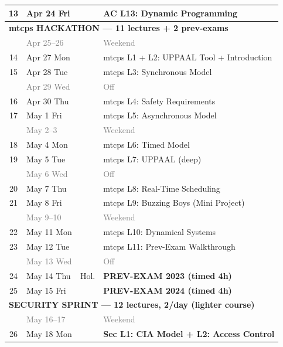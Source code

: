 \documentclass[11pt,a4paper]{article}
\begin{document}
\begin{center}
\begin{tabular}{clll}
13 & Apr 24 Fri & & \textcolor{accolor}{AC L13: Dynamic Programming} \\
\midrule
\multicolumn{4}{l}{\textcolor{mtcpscolor}{\textbf{mtcps HACKATHON --- 11 lectures + 2 prev-exams}}} \\
\midrule
  & \textcolor{gray}{Apr 25--26} & & \textcolor{gray}{Weekend} \\
14 & Apr 27 Mon & & \textcolor{mtcpscolor}{mtcps L1 + L2: UPPAAL Tool + Introduction} \\
15 & Apr 28 Tue & & \textcolor{mtcpscolor}{mtcps L3: Synchronous Model} \\
  & \textcolor{gray}{Apr 29 Wed} & & \textcolor{gray}{Off} \\
16 & Apr 30 Thu & & \textcolor{mtcpscolor}{mtcps L4: Safety Requirements} \\
17 & May 1 Fri & & \textcolor{mtcpscolor}{mtcps L5: Asynchronous Model} \\
  & \textcolor{gray}{May 2--3} & & \textcolor{gray}{Weekend} \\
18 & May 4 Mon & & \textcolor{mtcpscolor}{mtcps L6: Timed Model} \\
19 & May 5 Tue & & \textcolor{mtcpscolor}{mtcps L7: UPPAAL (deep)} \\
  & \textcolor{gray}{May 6 Wed} & & \textcolor{gray}{Off} \\
20 & May 7 Thu & & \textcolor{mtcpscolor}{mtcps L8: Real-Time Scheduling} \\
21 & May 8 Fri & & \textcolor{mtcpscolor}{mtcps L9: Buzzing Boys (Mini Project)} \\
  & \textcolor{gray}{May 9--10} & & \textcolor{gray}{Weekend} \\
22 & May 11 Mon & & \textcolor{mtcpscolor}{mtcps L10: Dynamical Systems} \\
23 & May 12 Tue & & \textcolor{mtcpscolor}{mtcps L11: Prev-Exam Walkthrough} \\
  & \textcolor{gray}{May 13 Wed} & & \textcolor{gray}{Off} \\
24 & May 14 Thu & \textcolor{successgreen}{Hol.} & \textcolor{mtcpscolor}{\textbf{PREV-EXAM 2023 (timed 4h)}} \\
25 & May 15 Fri & & \textcolor{mtcpscolor}{\textbf{PREV-EXAM 2024 (timed 4h)}} \\
\midrule
\multicolumn{4}{l}{\textbf{SECURITY SPRINT --- 12 lectures, 2/day (lighter course)}} \\
\midrule
  & \textcolor{gray}{May 16--17} & & \textcolor{gray}{Weekend} \\
26 & May 18 Mon & & \textbf{Sec L1: CIA Model + L2: Access Control} \\

\end{tabular}
\end{center}
\end{document}
